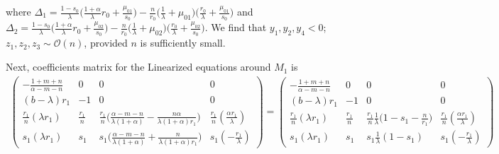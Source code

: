 \documentclass[a4paper,11pt]{article}
\def\BO{{\mathcal{O}}}
\theoremstyle{remark}
\begin{document}
where $\Delta_1 = \frac{1-s_0}{\lambda}\big(\frac{1+\alpha}{\lambda}r_0 + \frac{\mu_{01}}{s_0}\big) -\frac{n}{r_0} \big( \frac{1}{\lambda} + \mu_{01}\big)\big(\frac{r_0}{\lambda} + \frac{\mu_{01}}{s_0}\big)$
and $\Delta_2 = \frac{1-s_0}{\lambda}\big(\frac{1+\alpha}{\lambda}r_0 + \frac{\mu_{02}}{s_0}\big) -\frac{n}{r_0} \big( \frac{1}{\lambda} + \mu_{02}\big)\big(\frac{r_0}{\lambda} + \frac{\mu_{02}}{s_0}\big)$.
We find that $y_1,y_2,y_4<0$; $z_1,z_2,z_3 \sim\BO(n)$, provided $n$ is sufficiently small.

Next, coefficients matrix for the Linearized equations around $M_1$ is
\begin{align*}
 \begin{pmatrix}
          -\frac{1+m+n}{\alpha-m-n} & 0 & 0 & 0\\
          (b-\lambda)r_1 & -1 & 0 & 0\\
          \frac{r_1}{n}(\lambda r_1) & \frac{r_1}{n} & \frac{r_1}{n}\Big(\frac{\alpha-m-n}{\lambda(1+\alpha)} - \frac{n\alpha}{\lambda(1+\alpha)r_1}\Big) & \frac{r_1}{n}(\frac{\alpha r_1}{\lambda})\\
          s_1(\lambda r_1) & s_1 & s_1\Big(\frac{\alpha-m-n}{\lambda(1+\alpha)} + \frac{n}{\lambda(1+\alpha)r_1}\Big) & s_1(-\frac{r_1}{\lambda})
         \end{pmatrix}
         =\begin{pmatrix}
          -\frac{1+m+n}{\alpha-m-n} & 0 & 0 & 0\\
          (b-\lambda)r_1 & -1 & 0 & 0\\
          \frac{r_1}{n}(\lambda r_1) & \frac{r_1}{n} & \frac{r_1}{n}\frac{1}{\lambda}\Big(1-s_1-\frac{n}{r_1}\Big) & \frac{r_1}{n}(\frac{\alpha r_1}{\lambda})\\
          s_1(\lambda r_1) & s_1 & s_1\frac{1}{\lambda}(1-s_1) & s_1(-\frac{r_1}{\lambda})
         \end{pmatrix}
\end{align*}
\end{document}
